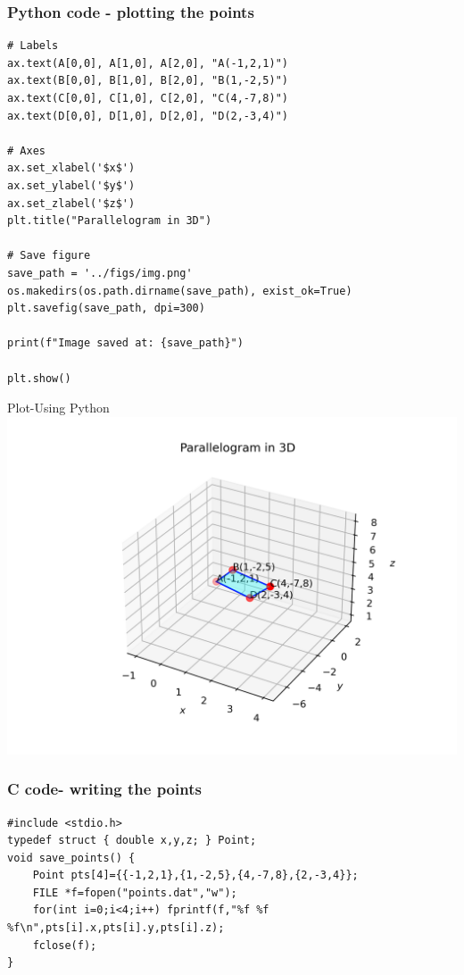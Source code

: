 \documentclass{beamer}
\begin{document}
\begin{frame}[fragile]                              
	\frametitle{Python code - plotting the points}
	\begin{lstlisting}
# Labels
ax.text(A[0,0], A[1,0], A[2,0], "A(-1,2,1)")
ax.text(B[0,0], B[1,0], B[2,0], "B(1,-2,5)")
ax.text(C[0,0], C[1,0], C[2,0], "C(4,-7,8)")
ax.text(D[0,0], D[1,0], D[2,0], "D(2,-3,4)")

# Axes
ax.set_xlabel('$x$')
ax.set_ylabel('$y$')
ax.set_zlabel('$z$')
plt.title("Parallelogram in 3D")

# Save figure
save_path = '../figs/img.png'
os.makedirs(os.path.dirname(save_path), exist_ok=True)
plt.savefig(save_path, dpi=300)

print(f"Image saved at: {save_path}")

plt.show()
\end{lstlisting}                               
\end{frame}

\begin{frame}{Plot-Using  Python}
    \centering
    \includegraphics[width=\columnwidth, height=0.8\textheight, keepaspectratio]{../figs/img.png}     
\end{frame}

\begin{frame}[fragile]                              
	\frametitle{C code- writing the points}
	\begin{lstlisting}
#include <stdio.h>
typedef struct { double x,y,z; } Point;
void save_points() {
    Point pts[4]={{-1,2,1},{1,-2,5},{4,-7,8},{2,-3,4}};
    FILE *f=fopen("points.dat","w");
    for(int i=0;i<4;i++) fprintf(f,"%f %f %f\n",pts[i].x,pts[i].y,pts[i].z);
    fclose(f);
}

\end{lstlisting}                               
\end{frame}
	
\end{document}
